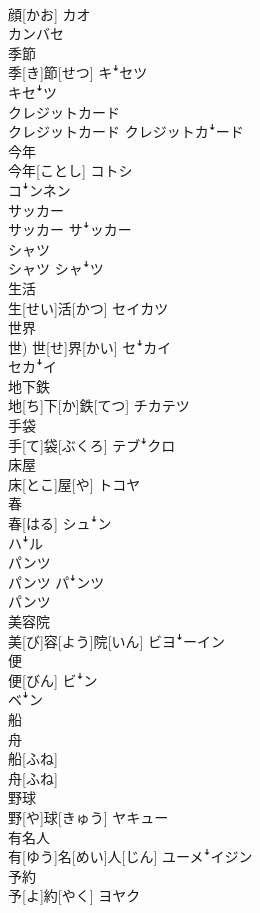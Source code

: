 \documentclass[8pt]{extreport}
\begin{document}
\begin{CJK}{UTF8}{min}
\\	顔[かお]	カオ 
\\	カンバセ
\\	季節	
\\	季[き]節[せつ]	キꜜセツ 
\\	キセꜜツ
\\	クレジットカード	
\\	クレジットカード	クレジットカꜜード
\\	今年	
\\	今年[ことし]	コトシ 
\\	コꜜンネン
\\	サッカー	
\\	サッカー	サꜜッカー
\\	シャツ	
\\	シャツ	シャꜜツ
\\	生活	
\\	生[せい]活[かつ]	セイカツ
\\	世界	
\\	世)	世[せ]界[かい]	セꜜカイ 
\\	セカꜜイ
\\	地下鉄	
\\	地[ち]下[か]鉄[てつ]	チカテツ
\\	手袋	
\\	手[て]袋[ぶくろ]	テブꜜクロ
\\	床屋	
\\	床[とこ]屋[や]	トコヤ
\\	春	
\\	春[はる]	シュꜜン 
\\	ハꜜル
\\	パンツ	
\\	パンツ	パꜜンツ 
\\	パンツ
\\	美容院	
\\	美[び]容[よう]院[いん]	ビヨꜜーイン
\\	便	
\\	便[びん]	ビꜜン 
\\	ベꜜン
\\	船 
\\	舟	
\\	船[ふね] 
\\	舟[ふね]	
\\	野球	
\\	野[や]球[きゅう]	ヤキュー
\\	有名人	
\\	有[ゆう]名[めい]人[じん]	ユーメꜜイジン
\\	予約	
\\	予[よ]約[やく]	ヨヤク

\end{CJK}
\end{document}
